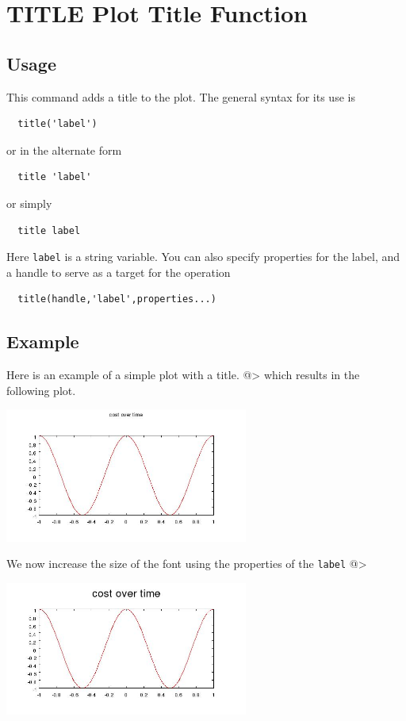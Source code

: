 \section{TITLE Plot Title Function}

\subsection{Usage}

This command adds a title to the plot.  The general syntax
for its use is
\begin{verbatim}
  title('label')
\end{verbatim}
or in the alternate form
\begin{verbatim}
  title 'label'
\end{verbatim}
or simply
\begin{verbatim}
  title label
\end{verbatim}
Here \verb|label| is a string variable.  You can also specify 
properties for the label, and a handle to serve as a target
for the operation
\begin{verbatim}
  title(handle,'label',properties...)
\end{verbatim}
\subsection{Example}

Here is an example of a simple plot with a title.
@>
which results in the following plot.


\centerline{\includegraphics[width=8cm]{title1}}

We now increase the size of the font using the properties
of the \verb|label|
@>


\centerline{\includegraphics[width=8cm]{title2}}

